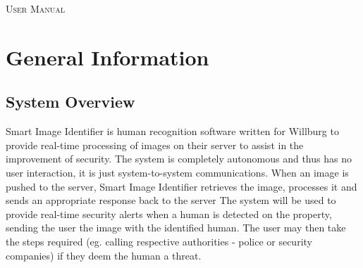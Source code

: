\documentclass[a4paper,12pt]{report}
\begin{document}
\renewcommand{\thesection}{\arabic{section}}
\newpage
\tableofcontents
\newpage

\begin{center}
\textsc{\LARGE User Manual}\\[1.5cm]
\end{center}

\section{General Information}
\subsection{System Overview}
Smart Image Identifier is human recognition software written for Willburg to provide real-time processing of images on their server to assist in the improvement of security. The system is completely autonomous and thus has no user interaction, it is just system-to-system communications. 
\newline\newline
When an image is pushed to the server, Smart Image Identifier retrieves the image, processes it and sends an appropriate response back to the server
\newline\newline
The system will be used to provide real-time security alerts when a human is detected on the property, sending the user the image with the identified human. The user may then take the steps required (eg. calling respective authorities - police or security companies) if they deem the human a threat.
\end{document}

